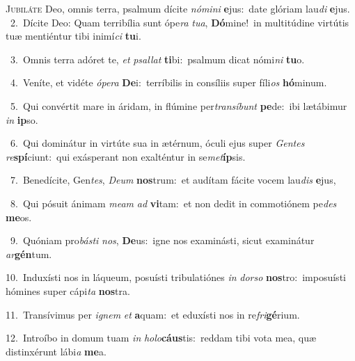\lettrine{\initial\textcolor{\initialcolor}{J}}{ubiláte} Deo, omnis terra, psalmum dícite \textit{nó}\-\textit{mi}\textit{ni} \textbf{e}\-jus:~\star date glóriam lau\textit{di} \textbf{e}\-jus.\\
{\numbfont\textcolor{\numbcolor}{~2.}}~Dícite Deo: Quam terribília sunt ópe\textit{ra} \textit{tu}\-\textit{a}, \textbf{Dó}\-mine!~\star in multitúdine virtútis tuæ mentiéntur tibi inimí\textit{ci} \textbf{tu}\-i.\par
{\numbfont\textcolor{\numbcolor}{~3.}}~Omnis terra adóret te, \textit{et} \textit{psal}\-\textit{lat} \textbf{ti}\-bi:~\star psalmum dicat nómi\textit{ni} \textbf{tu}\-o.\par
{\numbfont\textcolor{\numbcolor}{~4.}}~Veníte, et vidéte \textit{ó}\-\textit{pe}\textit{ra} \textbf{De}\-i:~\star terríbilis in consíliis super fíli\textit{os} \textbf{hó}\-minum.\par
{\numbfont\textcolor{\numbcolor}{~5.}}~Qui convértit mare in áridam, in flúmine per\-\textit{trans}\-\textit{í}\textit{bunt} \textbf{pe}\-de:~\star ibi lætábimur \textit{in} \textbf{ip}\-so.\par
{\numbfont\textcolor{\numbcolor}{~6.}}~Qui dominátur in virtúte sua in ætérnum, óculi ejus super \textit{Gen}\-\textit{tes} \textit{re}\-\textbf{spí}ciunt:~\star qui exásperant non exalténtur in se\-\textit{met}\-\textbf{íp}sis.\par
{\numbfont\textcolor{\numbcolor}{~7.}}~Benedícite, Gen\-\textit{tes}\-, \textit{De}\-\textit{um} \textbf{nos}\-trum:~\star et audítam fácite vocem lau\textit{dis} \textbf{e}\-jus,\par
{\numbfont\textcolor{\numbcolor}{~8.}}~Qui pósuit ánimam \textit{me}\-\textit{am} \textit{ad} \textbf{vi}\-tam:~\star et non dedit in commotiónem pe\textit{des} \textbf{me}\-os.\par
{\numbfont\textcolor{\numbcolor}{~9.}}~Quóniam pro\-\textit{bás}\-\textit{ti} \textit{nos}\-, \textbf{De}\-us:~\star igne nos examinásti, sicut examinátur \textit{ar}\-\textbf{gén}tum.\par
{\numbfont\textcolor{\numbcolor}{10.}}~Induxísti nos in láqueum, posuísti tribulatiónes \textit{in} \textit{dor}\-\textit{so} \textbf{nos}\-tro:~\star imposuísti hómines super cápi\textit{ta} \textbf{nos}\-tra.\par
{\numbfont\textcolor{\numbcolor}{11.}}~Transívimus per \textit{i}\-\textit{gnem} \textit{et} \textbf{a}\-quam:~\star et eduxísti nos in re\-\textit{fri}\-\textbf{gé}rium.\par
{\numbfont\textcolor{\numbcolor}{12.}}~Introíbo in domum tuam \textit{in} \textit{ho}\-\textit{lo}\textbf{cáus}tis:~\star reddam tibi vota mea, quæ distinxérunt lábi\textit{a} \textbf{me}\-a.\par
